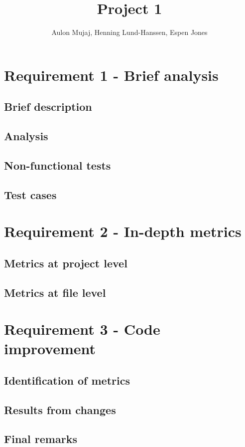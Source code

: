 \documentclass[UKenglish]{article}  %
\title{Project 1}        %
\author{Aulon Mujaj, Henning Lund-Hanssen, Espen Jones}                      %
\begin{document}
\maketitle{}

\section{Requirement 1 - Brief analysis}
\subsection{Brief description}
\subsection{Analysis}
\subsection{Non-functional tests}
\subsection{Test cases}
\section{Requirement 2 - In-depth metrics}
\subsection{Metrics at project level}
\subsection{Metrics at file level}
\section{Requirement 3 - Code improvement}
\subsection{Identification of metrics}
\subsection{Results from changes}
\subsection{Final remarks}
\end{document}
